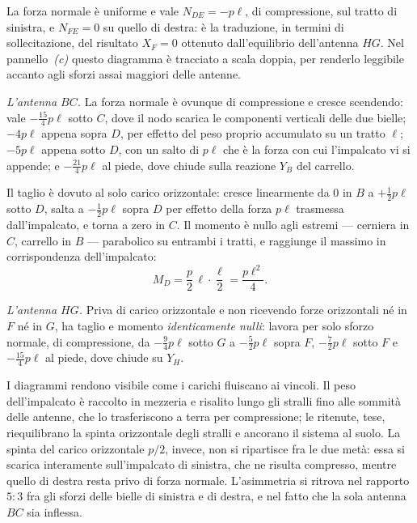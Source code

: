 La forza normale è uniforme e vale $N_{DE} = -p\ell$, di compressione,
sul tratto di sinistra, e $N_{FE} = 0$ su quello di destra: è la
traduzione, in termini di sollecitazione, del risultato $X_F = 0$
ottenuto dall'equilibrio dell'antenna $HG$. Nel pannello~\emph{(c)}
questo diagramma è tracciato a scala doppia, per renderlo leggibile
accanto agli sforzi assai maggiori delle antenne.


\medskip
\noindent\emph{L'antenna $BC$.}
La forza normale è ovunque di compressione e cresce
scendendo: vale $-\tfrac{15}{4}p\ell$ sotto $C$, dove il
nodo scarica le componenti verticali delle due bielle;
$-4p\ell$ appena sopra $D$, per effetto del peso proprio
accumulato su un tratto $\ell$; $-5p\ell$ appena sotto $D$,
con un salto di $p\ell$ che è la forza con cui l'impalcato vi
si appende; e $-\tfrac{21}{4}p\ell$ al piede, dove chiude
sulla reazione $Y_B$ del carrello.

Il taglio è dovuto al solo carico orizzontale: cresce
linearmente da $0$ in $B$ a $+\tfrac12 p\ell$ sotto $D$,
salta a $-\tfrac12 p\ell$ sopra $D$ per effetto della forza
$p\ell$ trasmessa dall'impalcato, e torna a zero in $C$.
Il momento è nullo agli estremi --- cerniera in $C$, carrello
in $B$ --- parabolico su entrambi i tratti, e raggiunge il
massimo in corrispondenza dell'impalcato:
\[
	M_D = \frac{p}{2}\,\ell\cdot\frac{\ell}{2}
	    = \frac{p\ell^2}{4}.
\]

\medskip
\noindent\emph{L'antenna $HG$.}
Priva di carico orizzontale e non ricevendo forze
orizzontali né in $F$ né in $G$, ha taglio e momento
\emph{identicamente nulli}: lavora per solo sforzo normale,
di compressione, da $-\tfrac94 p\ell$ sotto $G$ a
$-\tfrac52 p\ell$ sopra $F$, $-\tfrac72 p\ell$ sotto $F$ e
$-\tfrac{15}{4}p\ell$ al piede, dove chiude su $Y_H$.



\begin{oss}
	I diagrammi rendono visibile come i carichi fluiscano ai
	vincoli. Il peso dell'impalcato è raccolto in mezzeria e
	risalito lungo gli stralli fino alle sommità delle
	antenne, che lo trasferiscono a terra per compressione;
	le ritenute, tese, riequilibrano la spinta orizzontale
	degli stralli e ancorano il sistema al suolo. La spinta
	del carico orizzontale $p/2$, invece, non si ripartisce
	fra le due metà: essa si scarica interamente
	sull'impalcato di sinistra, che ne risulta compresso,
	mentre quello di destra resta privo di forza normale.
	L'asimmetria si ritrova nel rapporto $5:3$ fra gli sforzi
	delle bielle di sinistra e di destra, e nel fatto che la
	sola antenna $BC$ sia inflessa.
\end{oss}



